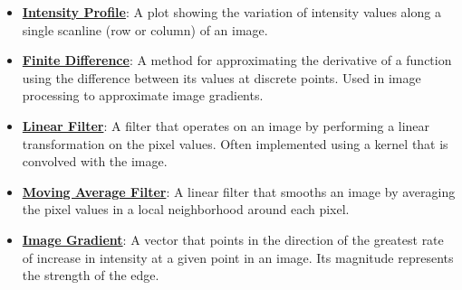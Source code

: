 \documentclass{article}%
\begin{document}
\begin{itemize}[leftmargin=*]
\item \href{https://purdue.brightspace.com/d2l/common/assets/pdfjs-d2l-dist/1.0.14-legacy/web/viewer.html?file=\%2Fcontent\%2Fenforced\%2F1095467-wl.202510.CS.24300.001\%2F08L2-Feature Extraction.pdf\%3Fou\%3D1095467\&lang=en-us\&container=d2l-fileviewer-rendered-pdf\&fullscreen=d2l-fileviewer-rendered-pdf-dialog\&height=667#page=14}{\textbf{Intensity Profile}}: A plot showing the variation of intensity values along a single scanline (row or column) of an image.%
\item \href{https://purdue.brightspace.com/d2l/common/assets/pdfjs-d2l-dist/1.0.14-legacy/web/viewer.html?file=\%2Fcontent\%2Fenforced\%2F1095467-wl.202510.CS.24300.001\%2F08L2-Feature Extraction.pdf\%3Fou\%3D1095467\&lang=en-us\&container=d2l-fileviewer-rendered-pdf\&fullscreen=d2l-fileviewer-rendered-pdf-dialog\&height=667#page=15}{\textbf{Finite Difference}}: A method for approximating the derivative of a function using the difference between its values at discrete points. Used in image processing to approximate image gradients.%
\item \href{https://purdue.brightspace.com/d2l/common/assets/pdfjs-d2l-dist/1.0.14-legacy/web/viewer.html?file=\%2Fcontent\%2Fenforced\%2F1095467-wl.202510.CS.24300.001\%2F08L2-Feature Extraction.pdf\%3Fou\%3D1095467\&lang=en-us\&container=d2l-fileviewer-rendered-pdf\&fullscreen=d2l-fileviewer-rendered-pdf-dialog\&height=667#page=15}{\textbf{Linear Filter}}: A filter that operates on an image by performing a linear transformation on the pixel values. Often implemented using a kernel that is convolved with the image.%
\item \href{https://purdue.brightspace.com/d2l/common/assets/pdfjs-d2l-dist/1.0.14-legacy/web/viewer.html?file=\%2Fcontent\%2Fenforced\%2F1095467-wl.202510.CS.24300.001\%2F08L2-Feature Extraction.pdf\%3Fou\%3D1095467\&lang=en-us\&container=d2l-fileviewer-rendered-pdf\&fullscreen=d2l-fileviewer-rendered-pdf-dialog\&height=667#page=16}{\textbf{Moving Average Filter}}: A linear filter that smooths an image by averaging the pixel values in a local neighborhood around each pixel.%
\item \href{https://purdue.brightspace.com/d2l/common/assets/pdfjs-d2l-dist/1.0.14-legacy/web/viewer.html?file=\%2Fcontent\%2Fenforced\%2F1095467-wl.202510.CS.24300.001\%2F08L2-Feature Extraction.pdf\%3Fou\%3D1095467\&lang=en-us\&container=d2l-fileviewer-rendered-pdf\&fullscreen=d2l-fileviewer-rendered-pdf-dialog\&height=667#page=17}{\textbf{Image Gradient}}: A vector that points in the direction of the greatest rate of increase in intensity at a given point in an image. Its magnitude represents the strength of the edge.%

\end{itemize}
\end{document}
